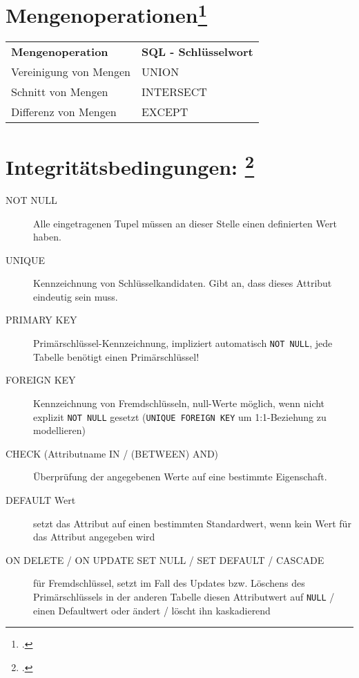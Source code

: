 \documentclass{lehramt-informatik}
\begin{document}
\section{Mengenoperationen\footcite[Seite 157]{winter}}

\noindent
\begin{tabular}{ll}
\textbf{Mengenoperation} &
\textbf{SQL - Schlüsselwort} \\

Vereinigung von Mengen &
UNION \\

Schnitt von Mengen &
INTERSECT \\

Differenz von Mengen &
EXCEPT \\
\end{tabular}

%

\section{Integritätsbedingungen:
\footcite[Seite 7]{db:fs:2}}

\begin{description}

\item[NOT NULL]

Alle eingetragenen Tupel müssen an dieser Stelle einen definierten Wert
haben.

\item[UNIQUE]

Kennzeichnung von Schlüsselkandidaten. Gibt an, dass dieses Attribut
eindeutig sein muss.

\item[PRIMARY KEY]

Primärschlüssel-Kennzeichnung, impliziert automatisch \verb|NOT NULL|,
jede Tabelle benötigt einen Primärschlüssel!

\item[FOREIGN KEY]

Kennzeichnung von Fremdschlüsseln, null-Werte möglich, wenn nicht
explizit \verb|NOT NULL| gesetzt (\verb|UNIQUE FOREIGN KEY| um
1:1-Beziehung zu modellieren)

\item[CHECK (Attributname IN / (BETWEEN) AND)]

Überprüfung der angegebenen Werte auf eine bestimmte Eigenschaft.

\item[DEFAULT Wert]

setzt das Attribut auf einen bestimmten Standardwert, wenn kein Wert für
das Attribut angegeben wird

\item[ON DELETE / ON UPDATE SET NULL / SET DEFAULT / CASCADE]

für Fremdschlüssel, setzt im Fall des Updates bzw. Löschens des
Primärschlüssels in der anderen Tabelle diesen Attributwert auf
\verb|NULL| / einen Defaultwert oder ändert / löscht ihn kaskadierend
\end{description}
\end{document}
